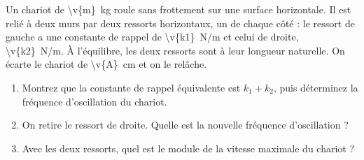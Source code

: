 Un chariot de \qty{\v{m}}{kg} roule sans frottement sur une surface horizontale. Il est relié à deux murs par deux ressorts horizontaux, un de chaque côté : le ressort de gauche a une constante de rappel de \qty{\v{k1}}{N/m} et celui de droite, \qty{\v{k2}}{N/m}. À l'équilibre, les deux ressorts sont à leur longueur naturelle. On écarte le chariot de \qty{\v{A}}{cm} et on le relâche.

\begin{center}
\end{center}

\begin{enumerate}[label=\alph*)]
    \item Montrez que la constante de rappel équivalente est $k_1 + k_2$, puis déterminez la fréquence d'oscillation du chariot.
    \item On retire le ressort de droite. Quelle est la nouvelle fréquence d'oscillation ?
    \item Avec les deux ressorts, quel est le module de la vitesse maximale du chariot ?
\end{enumerate}
